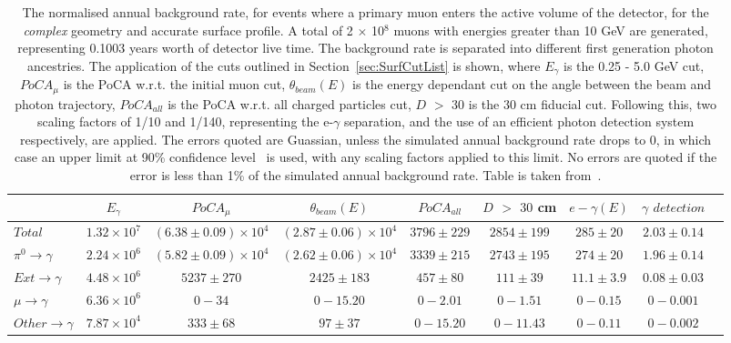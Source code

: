 \begin{table}
  \caption[The normalised annual background rate, for events where a primary muon enters the active volume of the detector, for the \emph{complex} geometry and accurate surface profile]
          {The normalised annual background rate, for events where a primary muon enters the active volume of the detector, for the \emph{complex} geometry and accurate surface profile. A total of 2 $\times$ 10$^8$ muons with energies greater than 10 GeV are generated, representing 0.1003 years worth of detector live time. The background rate is separated into different first generation photon ancestries. The application of the cuts outlined in Section~\ref{sec:SurfCutList} is shown, where $E_\gamma$ is the 0.25 - 5.0 GeV cut, $PoCA_\mu$ is the PoCA w.r.t. the initial muon cut, $\theta_{beam}(E)$ is the energy dependant cut on the angle between the beam and photon trajectory, $PoCA_{all}$ is the PoCA w.r.t. all charged particles cut, $D$ $>$ $30$ is the 30 cm fiducial cut. Following this, two scaling factors of 1/10 and 1/140, representing the e-$\gamma$ separation, and the use of an efficient photon detection system respectively, are applied. The errors quoted are Guassian, unless the simulated annual background rate drops to 0, in which case an upper limit at 90\% confidence level~\citep{PhysRevD.57.3873} is used, with any scaling factors applied to this limit. No errors are quoted if the error is less than 1\% of the simulated annual background rate. Table is taken from~\citep{MartinsThesis}.}
  \label{tab:SurfMuComp}
  \centering
  \scriptsize
  \begin{tabular}{l c c c c c c c c }
    \toprule
        & $E_\gamma$ & $PoCA_\mu$ & $\theta_{beam}(E)$ & $PoCA_{all}$ & $D$ $>$ $30$ cm & $e-\gamma(E)$ & $\gamma$ $detection$ \\
        \midrule
        $Total$          & $1.32\times10^7$ & $(6.38\pm0.09)\times10^4$ & $(2.87\pm0.06)\times10^4$ & $3796\pm229$ & $2854\pm199$ & $285\pm20$   & $2.03\pm0.14$ \\

        $\pi^0\to\gamma$ & $2.24\times10^6$ & $(5.82\pm0.09)\times10^4$ & $(2.62\pm0.06)\times10^4$ & $3339\pm215$ & $2743\pm195$ & $274\pm20$   & $1.96\pm0.14$ \\

        $Ext\to\gamma$   & $4.48\times10^6$ & $5237\pm270$              & $2425\pm183$              & $457\pm80$   & $111\pm39$   & $11.1\pm3.9$ & $0.08\pm0.03$ \\

        $\mu\to\gamma$   & $6.36\times10^6$ & $0-34$                    & $0-15.20$                 & $0-2.01$     & $0-1.51$     & $0-0.15$     & $0-0.001$ \\

        $Other\to\gamma$ & $7.87\times10^4$ & $333\pm68$                & $97\pm37$                 & $0-15.20$    & $0-11.43$    & $0-0.11$     & $0-0.002$ \\
        \bottomrule
  \end{tabular}
\end{table}


